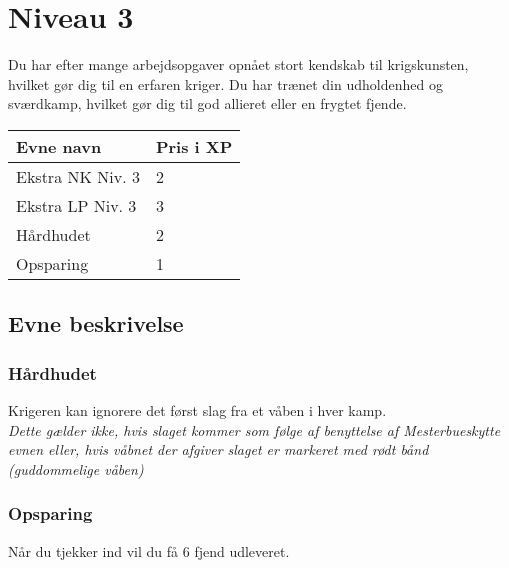 \chapter*{Niveau 3}
Du har efter mange arbejdsopgaver opnået stort kendskab til krigskunsten, hvilket gør dig til en erfaren kriger. Du har trænet din udholdenhed og sværdkamp, hvilket gør dig til god allieret eller en frygtet fjende.
\begin{table}[H]
    \centering
    \begin{tabular}{|p{}|p{}|}
    \rowcolor{cerulean!80}\hline
        Evne navn & Pris i XP \\\hline
         Ekstra NK Niv. 3 & 2 \\\hline
         Ekstra LP Niv. 3 & 3 \\\hline
         Hårdhudet & 2\\\hline
         Opsparing & 1\\
         \hline
    \end{tabular}
\end{table}
\section*{Evne beskrivelse}





\subsection*{Hårdhudet}
Krigeren kan ignorere det først slag fra et våben i hver kamp.\\
\emph{Dette gælder ikke, hvis slaget kommer som følge af benyttelse af Mesterbueskytte evnen eller, hvis våbnet der afgiver slaget er markeret med rødt bånd (guddommelige våben)}\\

\subsection*{Opsparing}
Når du tjekker ind vil du få 6 fjend udleveret.